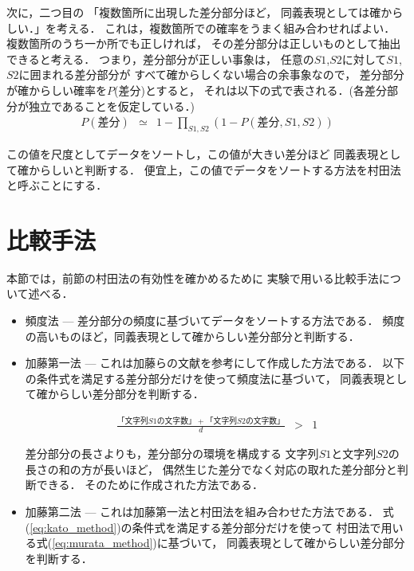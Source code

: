次に，二つ目の
「複数箇所に出現した差分部分ほど，
同義表現としては確からしい．」を考える．
これは，複数箇所での確率をうまく組み合わせればよい．
複数箇所のうち一か所でも正しければ，
その差分部分は正しいものとして抽出できると考える．
つまり，差分部分が正しい事象は，
任意の$S1$,$S2$に対して$S1$,$S2$に囲まれる差分部分が
すべて確からしくない場合の余事象なので，
差分部分が確からしい確率を$P$(差分)とすると，
それは以下の式で表される．(各差分部分が独立であることを仮定している．)
\begin{eqnarray}
P(差分) & \simeq & 1 - \prod_{S1,S2}{(1 - P(差分,S1,S2))}
  \label{eq:murata_method}
\end{eqnarray}

この値を尺度としてデータをソートし，この値が大きい差分ほど
同義表現として確からしいと判断する．
便宜上，この値でデータをソートする方法を村田法と呼ぶことにする．

\section{比較手法}
\label{sec:comp_method}

本節では，前節の村田法の有効性を確かめるために
実験で用いる比較手法について述べる．

\begin{itemize}
\item 
  頻度法 --- 差分部分の頻度に基づいてデータをソートする方法である．
  頻度の高いものほど，同義表現として確からしい差分部分と判断する．

\item 
  加藤第一法 --- これは加藤らの文献\cite{Kato1999}を参考にして作成した方法である．
  以下の条件式を満足する差分部分だけを使って頻度法に基づいて，
  同義表現として確からしい差分部分を判断する．

\begin{eqnarray}
  \frac{「文字列S1の文字数」+「文字列S2の文字数」}{d} & > & 1
  \label{eq:kato_method}
\end{eqnarray}

差分部分の長さよりも，差分部分の環境を構成する
文字列$S1$と文字列$S2$の長さの和の方が長いほど，
偶然生じた差分でなく対応の取れた差分部分と判断できる．
そのために作成された方法である．

\item 
  加藤第二法 --- これは加藤第一法と村田法を組み合わせた方法である．
  式(\ref{eq:kato_method})の条件式を満足する差分部分だけを使って
  村田法で用いる式(\ref{eq:murata_method})に基づいて，
  同義表現として確からしい差分部分を判断する．

\end{itemize}

